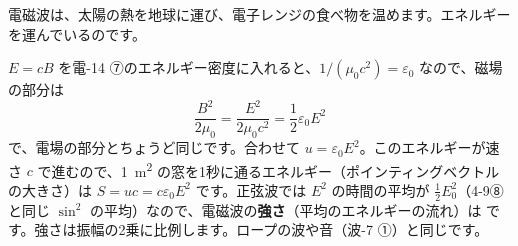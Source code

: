 
\leavevmode\label{ph:電-15:sec5}電磁波は、太陽の熱を地球に運び、電子レンジの食べ物を温めます。エネルギーを運んでいるのです。

$E=cB$ を電-14 ⑦のエネルギー密度に入れると、$1/(\mu_0c^2)=\varepsilon_0$ なので、磁場の部分は
\[ \frac{B^2}{2\mu_0}=\frac{E^2}{2\mu_0c^2}=\frac12\varepsilon_0E^2 \]
で、電場の部分とちょうど同じです。合わせて $u=\varepsilon_0E^2$。このエネルギーが速さ $c$ で進むので、\qty{1}{m^2} の窓を1秒に通るエネルギー（ポインティングベクトルの大きさ）は $S=uc=c\varepsilon_0E^2$ です。正弦波では $E^2$ の時間の平均が $\tfrac12E_0^2$（4-9⑧と同じ $\sin^2$ の平均）なので、電磁波の\textbf{強さ}（平均のエネルギーの流れ）は
\label{ph:電-15:I}です。強さは振幅の2乗に比例します。ロープの波や音（波-7 ①）と同じです。

